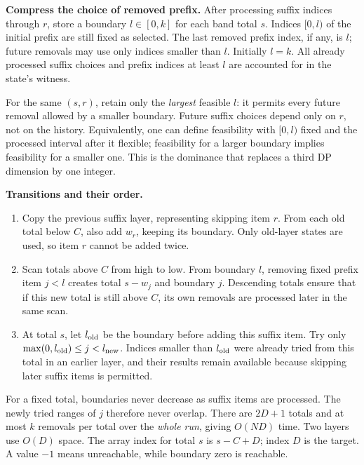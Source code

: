 \textbf{Compress the choice of removed prefix.} After processing
suffix indices through $r$, store a boundary $l\in[0,k]$ for each
band total $s$. Indices $[0,l)$ of the initial prefix are still fixed
as selected. The last removed prefix index, if any, is $l$; future
removals may use only indices smaller than $l$. Initially $l=k$.
All already processed suffix choices and prefix indices at least $l$
are accounted for in the state's witness.

For the same $(s,r)$, retain only the \emph{largest} feasible $l$:
it permits every future removal allowed by a smaller boundary.
Future suffix choices depend only on $r$, not on the history.
Equivalently, one can define feasibility with $[0,l)$ fixed and the
processed interval after it flexible; feasibility for a larger
boundary implies feasibility for a smaller one. This is the dominance
that replaces a third DP dimension by one integer.

\textbf{Transitions and their order.}
\begin{enumerate}
\item Copy the previous suffix layer, representing skipping item $r$.
From each old total below $C$, also add $w_r$, keeping its boundary.
Only old-layer states are used, so item $r$ cannot be added twice.
\item Scan totals above $C$ from high to low. From boundary $l$,
removing fixed prefix item $j<l$ creates total $s-w_j$ and boundary
$j$. Descending totals ensure that if this new total is still above
$C$, its own removals are processed later in the same scan.
\item At total $s$, let $l_{\rm old}$ be the boundary before adding
this suffix item. Try only
$\max(0,l_{\rm old})\le j<l_{\rm new}$.
Indices smaller than $l_{\rm old}$ were already tried from this total
in an earlier layer, and their results remain available because
skipping later suffix items is permitted.
\end{enumerate}
For a fixed total, boundaries never decrease as suffix items are
processed. The newly tried ranges of $j$ therefore never overlap.
There are $2D+1$ totals and at most $k$ removals per total over the
\emph{whole run}, giving $O(ND)$ time. Two layers use $O(D)$ space.
The array index for total $s$ is $s-C+D$; index $D$ is the target.
A value $-1$ means unreachable, while boundary zero is reachable.

